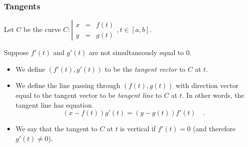\begin{frame}
\frametitle{Tangents}
Let $C $ be the curve $C:\left|\begin{array}{rcl}x&=&f(t)\\y&=&g(t)\end{array} \right., t\in [a,b]$.
\begin{definition}
Suppose \alert<4,5>{ $f'(t)$ and $g'(t)$ are not simultaneously equal to $0$.} 
\begin{itemize}
\item  We define $(f'(t), g'(t))$ to be the \emph{tangent vector} to $C$ at $t$.
\item<2->  We define the line passing through $(f(t), g(t))$ with direction vector equal to the tangent vector to be \emph{tangent line} to $C$ at $t$. In other words, the tangent line has equation
\[
(x-f(t))g'(t) =(y-g(t))f'(t)\quad .
\]
\item<3->  We say that the tangent to $C$ at $t$ is vertical if $f'(t)=0$ (\alert<4>{and therefore $g'(t)\neq 0$}).
\end{itemize}
\end{definition}
\end{frame}

